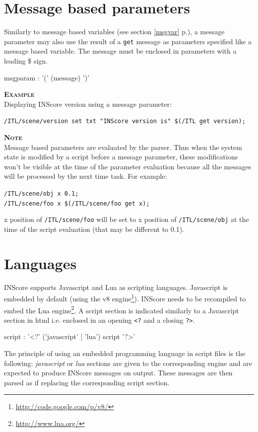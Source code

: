 \documentclass[a4paper,twoside]{report}
\newcommand{\sublevel}[1]	{\section{#1}}
\newcommand{\fullref}[1]	{\ref{#1} p.\pageref{#1}}
\newcommand{\OSC}[1]		{\texttt{#1}}
\newcommand{\example}		{\textbf{\hspace{-1.5cm}\textbf{\textsc{Example }}}}
\newcommand{\note}	[1]		{\vspace{2mm}\textbf{\hspace{-1.03cm}\textbf{\textsc{Note #1}}}}
\newcommand{\sample}	[1]			{\vspace{-2mm}\begin{center}\colorbox{mygrey}{
								\begin{minipage}[t]{0.9\columnwidth} 
								{\small \texttt{#1}}
								\end{minipage}}\end{center}}
\begin{document}
\sublevel{Message based parameters}\label{scriptmsgparam}

Similarly to message based variables (see section \fullref{msgvar}), a message parameter may also use the result of a \OSC{get} message as parameters specified like a message based variable.
The message must be enclosed in parameters with a leading \$ sign.
\begin{rail} 
msgparam : '(' (message) ')'
\end{rail}

\example \\
Displaying INScore version using a message parameter:
\sample{/ITL/scene/version set  txt "INScore version is" \$(/ITL get version);}

\note{}\\
Message based parameters are evaluated by the parser. Thus when the system state is modified by a script before a message parameter, these modifications won't be visible at the time of the parameter evaluation because all the messages will be processed by the next time task. For example:\\
\sample{/ITL/scene/obj x 0.1;\\
/ITL/scene/foo x \$(/ITL/scene/foo get x);}
x position of \OSC{/ITL/scene/foo} will be set to x position of \OSC{/ITL/scene/obj} at the time of the script evaluation (that may be different to 0.1).

\sublevel{Languages}\label{scriptlang}


INScore supports Javascript and Lua as scripting languages. Javascript is embedded by default (using the v8 engine\footnote{\url{http://code.google.com/p/v8/}}). INScore needs to be recompiled to embed the Lua engine\footnote{\url{http://www.lua.org/}}. A script section is indicated similarly to a Javascript section in html i.e. enclosed in an opening \OSC{<?} and a closing \OSC{?>}.
\begin{rail} 
script : '<?' ('javascript' | 'lua') script '?>'
\end{rail}

The principle of using an embedded programming language in script files is the following: \emph{javascript} or \emph{lua} sections are given to the corresponding engine and are expected to produce INScore messages on output.
These messages are then parsed as if replacing the corresponding script section.
\end{document}
